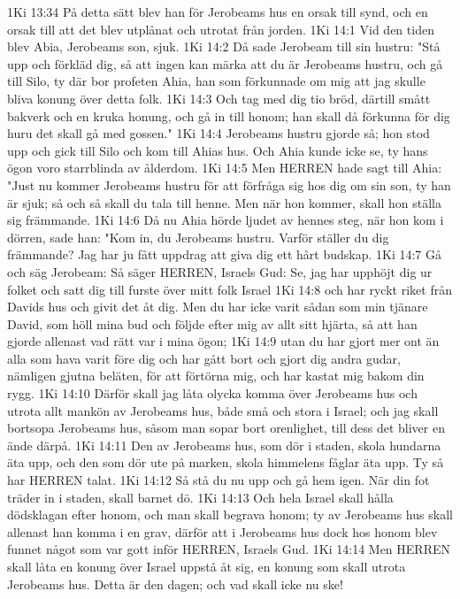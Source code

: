 1Ki 13:34  På detta sätt blev han för Jerobeams hus en orsak till synd, och en orsak till att det blev utplånat och utrotat från jorden.
1Ki 14:1  Vid den tiden blev Abia, Jerobeams son, sjuk.
1Ki 14:2  Då sade Jerobeam till sin hustru: "Stå upp och förkläd dig, så att ingen kan märka att du är Jerobeams hustru, och gå till Silo, ty där bor profeten Ahia, han som förkunnade om mig att jag skulle bliva konung över detta folk.
1Ki 14:3  Och tag med dig tio bröd, därtill smått bakverk och en kruka honung, och gå in till honom; han skall då förkunna för dig huru det skall gå med gossen."
1Ki 14:4  Jerobeams hustru gjorde så; hon stod upp och gick till Silo och kom till Ahias hus. Och Ahia kunde icke se, ty hans ögon voro starrblinda av ålderdom.
1Ki 14:5  Men HERREN hade sagt till Ahia: "Just nu kommer Jerobeams hustru för att förfråga sig hos dig om sin son, ty han är sjuk; så och så skall du tala till henne. Men när hon kommer, skall hon ställa sig främmande.
1Ki 14:6  Då nu Ahia hörde ljudet av hennes steg, när hon kom i dörren, sade han: "Kom in, du Jerobeams hustru. Varför ställer du dig främmande? Jag har ju fått uppdrag att giva dig ett hårt budskap.
1Ki 14:7  Gå och säg Jerobeam: Så säger HERREN, Israels Gud: Se, jag har upphöjt dig ur folket och satt dig till furste över mitt folk Israel
1Ki 14:8  och har ryckt riket från Davids hus och givit det åt dig. Men du har icke varit sådan som min tjänare David, som höll mina bud och följde efter mig av allt sitt hjärta, så att han gjorde allenast vad rätt var i mina ögon;
1Ki 14:9  utan du har gjort mer ont än alla som hava varit före dig och har gått bort och gjort dig andra gudar, nämligen gjutna beläten, för att förtörna mig, och har kastat mig bakom din rygg.
1Ki 14:10  Därför skall jag låta olycka komma över Jerobeams hus och utrota allt mankön av Jerobeams hus, både små och stora i Israel; och jag skall bortsopa Jerobeams hus, såsom man sopar bort orenlighet, till dess det bliver en ände därpå.
1Ki 14:11  Den av Jerobeams hus, som dör i staden, skola hundarna äta upp, och den som dör ute på marken, skola himmelens fåglar äta upp. Ty så har HERREN talat.
1Ki 14:12  Så stå du nu upp och gå hem igen. När din fot träder in i staden, skall barnet dö.
1Ki 14:13  Och hela Israel skall hålla dödsklagan efter honom, och man skall begrava honom; ty av Jerobeams hus skall allenast han komma i en grav, därför att i Jerobeams hus dock hos honom blev funnet något som var gott inför HERREN, Israels Gud.
1Ki 14:14  Men HERREN skall låta en konung över Israel uppstå åt sig, en konung som skall utrota Jerobeams hus. Detta är den dagen; och vad skall icke nu ske!
